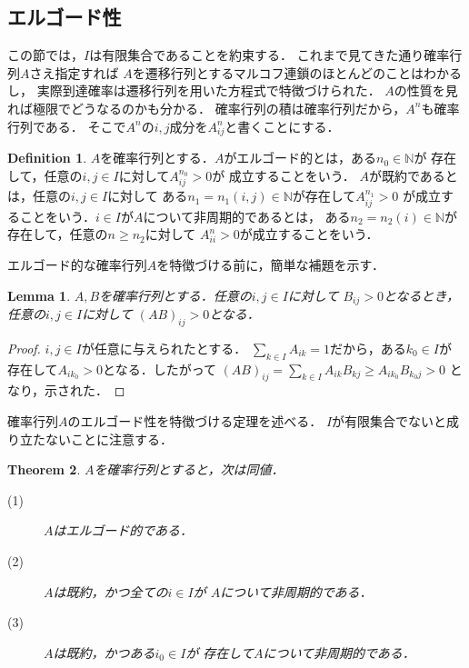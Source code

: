 \documentclass[dvipdfmx,autodetect-engine]{jsarticle}
\newtheorem{theorem}{Theorem}[section]
\newtheorem{lemma}[theorem]{Lemma}
\theoremstyle{remark}
\theoremstyle{definition}
\newtheorem{definition}{Definition}[section]
\newcommand{\N}{\mathbb{N}}
\begin{document}
\subsection{エルゴード性}
この節では，$I$は有限集合であることを約束する．
これまで見てきた通り確率行列$A$さえ指定すれば
$A$を遷移行列とするマルコフ連鎖のほとんどのことはわかるし，
実際到達確率は遷移行列を用いた方程式で特徴づけられた．
$A$の性質を見れば極限でどうなるのかも分かる．
確率行列の積は確率行列だから，$A^n$も確率行列である．
そこで$A^n$の$i,j$成分を$A_{ij}^n$と書くことにする．


\begin{definition}\label{ergodic}
    $A$を確率行列とする．$A$がエルゴード的とは，ある$n_0 \in \N$が
    存在して，任意の$i,j \in I$に対して$A_{ij}^{n_0}>0$が
    成立することをいう．
    $A$が既約であるとは，任意の$i,j\in I$に対して
    ある$n_1 = n_1(i,j)  \in \N$が存在して$A_{ij}^{n_1} >0$
    が成立することをいう．$i \in I$が$A$について非周期的であるとは，
    ある$n_2= n_2(i) \in \N$が存在して，任意の$n \geq n_2$に対して
    $A_{ii}^{n} > 0$が成立することをいう．
\end{definition}


エルゴード的な確率行列$A$を特徴づける前に，簡単な補題を示す．


\begin{lemma}\label{lem_prod}
    $A,B$を確率行列とする．任意の$i,j \in I$に対して
    $B_{ij}>0$となるとき，任意の$i,j \in I$に対して
    $(AB)_{ij} >0$となる．
\end{lemma}


\begin{proof}
    $i,j \in I$が任意に与えられたとする．
    $\sum_{k \in I} A_{ik} = 1$だから，ある$k_0 \in I$が
    存在して$A_{i k_0}>0$となる．したがって
    $(AB)_{ij} = \sum_{k \in I} A_{ik} B_{kj} \geq A_{ik_0}B_{k_0 j} > 0$
    となり，示された．
\end{proof}


確率行列$A$のエルゴード性を特徴づける定理を述べる．
$I$が有限集合でないと成り立たないことに注意する．


\begin{theorem}
    $A$を確率行列とすると，次は同値．
    \begin{description}
        \item[(1)] $A$はエルゴード的である．
        \item[(2)] $A$は既約，かつ全ての$i \in I$が
        $A$について非周期的である． 
        \item[(3)] $A$は既約，かつある$i_0 \in I$が
        存在して$A$について非周期的である． 
    \end{description}
\end{theorem}
\end{document}
